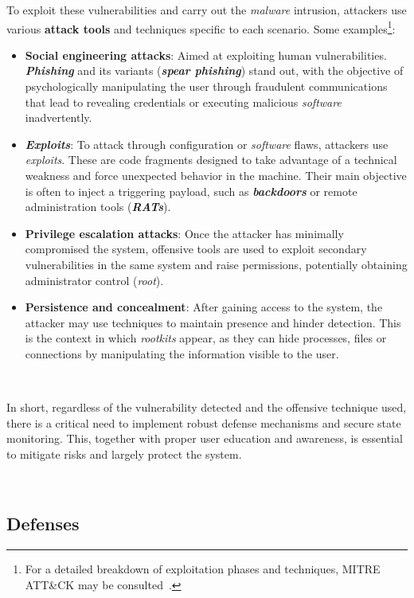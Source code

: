 To exploit these vulnerabilities and carry out the \textit{malware} intrusion, attackers use various \textbf{attack tools} and techniques specific to each scenario.
Some examples\footnote{For a detailed breakdown of exploitation phases and techniques, MITRE ATT\&CK may be consulted~\cite{mitre_attack}.}:
\begin{itemize}
    \item \textbf{Social engineering attacks}: Aimed at exploiting human vulnerabilities. \textbf{\textit{Phishing}} and its variants (\textbf{\textit{spear phishing}}) stand out,
    with the objective of psychologically manipulating the user through fraudulent communications that lead to revealing credentials or executing malicious \textit{software} inadvertently.
    \item \textbf{\textit{Exploits}}: To attack through configuration or \textit{software} flaws, attackers use \textit{exploits}.
    These are code fragments designed to take advantage of a technical weakness and force unexpected behavior in the machine.
    Their main objective is often to inject a triggering payload, such as \textbf{\textit{backdoors}} or remote administration tools (\textbf{\textit{RATs}}).
    \item \textbf{Privilege escalation attacks}: Once the attacker has minimally compromised the system,
    offensive tools are used to exploit secondary vulnerabilities in the same system and raise permissions, potentially obtaining administrator control (\textit{root}).
    \item \textbf{Persistence and concealment}: After gaining access to the system, the attacker may use techniques to maintain presence and hinder detection.
    This is the context in which \textit{rootkits} appear, as they can hide processes, files or connections by manipulating the information visible to the user.
\end{itemize}

\

In short, regardless of the vulnerability detected and the offensive technique used, there is a critical need to implement robust defense mechanisms and secure state monitoring.
This, together with proper user education and awareness, is essential to mitigate risks and largely protect the system.

\

\subsection{Defenses}
\label{sec:defensas}

